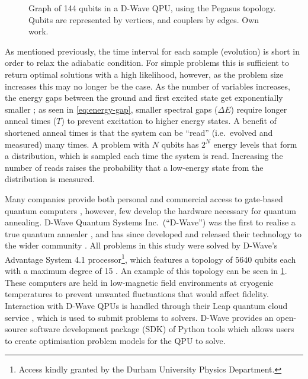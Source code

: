\documentclass[12pt]{article}
\theoremstyle{definition}
\begin{document}
\begin{figure}[ht]
    \centering
    
    \caption{Graph of \num{144} qubits in a D-Wave QPU, using the Pegasus topology. Qubits are represented by vertices, and couplers by edges. Own work.}
    \label{fig:pegasus}
\end{figure}

As mentioned previously, the time interval for each sample (evolution) is short in order to relax the adiabatic condition. For simple problems this is sufficient to return optimal solutions with a high likelihood, however, as the problem size increases this may no longer be the case. As the number of variables increases, the energy gaps between the ground and first excited state get exponentially smaller \cite{bapst_quantum_2013}; as seen in \cref{eq:energy-gap}, smaller spectral gaps ($\Delta E$) require longer anneal times ($T$) to prevent excitation to higher energy states.
A benefit of shortened anneal times is that the system can be ``read'' (i.e.\ evolved and measured) many times. A problem with $N$ qubits has $2^N$ energy levels that form a distribution, which is sampled each time the system is read. Increasing the number of reads raises the probability that a low-energy state from the distribution is measured.

Many companies provide both personal and commercial access to gate-based quantum computers \cites{google}{ibm}, however, few develop the hardware necessary for quantum annealing. D-Wave Quantum Systems Inc.\ (``D-Wave'') was the first to realise a true quantum annealer \cite{johnson_quantum_2011}, and has since developed and released their technology to the wider community \cite{finley_quantum_2017}. All problems in this study were solved by D-Wave's Advantage System 4.1 processor\footnote{Access kindly granted by the Durham University Physics Department.}, which features a topology of \num{5640} qubits each with a maximum degree of \num{15} \cite{dwave_topology}. An example of this topology can be seen in \cref{fig:pegasus}. These computers are held in low-magnetic field environments at cryogenic temperatures to prevent unwanted fluctuations that would affect fidelity.
Interaction with D-Wave QPUs is handled through their Leap quantum cloud service \cite{dwave_leap}, which is used to submit problems to solvers. D-Wave provides an open-source software development package (SDK) of Python tools which allows users to create optimisation problem models for the QPU to solve.
\end{document}
